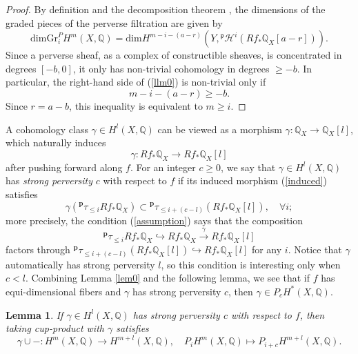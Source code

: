 \documentclass[11pt]{amsart}
\theoremstyle{plain}
\newtheorem{lem}[thm]{Lemma}
\theoremstyle{definition}
\theoremstyle{remark}
\newcommand{\BQ}{{\mathbb{Q}}}
\newcommand{\CH}{{\mathcal H}}
\begin{document}
\begin{proof}
By definition and the decomposition theorem \cite{BBD}, the dimensions of the graded pieces of the perverse filtration are given by
\begin{equation}\label{llm0}
\mathrm{dim} \mathrm{Gr}^P_iH^{m}(X, \BQ) = \mathrm{dim} H^{m-i-(a-r)}\left(Y,{^\mathfrak{p}\CH^i(Rf_* \BQ_X[a-r])}\right).
\end{equation}
Since a perverse sheaf, as a complex of constructible sheaves, is concentrated in degrees $[-b, 0]$, it only has non-trivial cohomology in degrees $\geq -b$. In particular, the right-hand side of (\ref{llm0}) is non-trivial only if 
\[
m-i-(a-r) \geq -b.
\]
Since $r=a-b$, this inequality is equivalent to $m \geq i$.
\end{proof}


A cohomology class $\gamma \in H^l(X, \BQ)$ can be viewed as a morphism $\gamma: \BQ_X \to \BQ_X[l]$, which naturally induces 
\begin{equation}\label{induced}
\gamma: Rf_* \BQ_X \to Rf_* \BQ_X [l]
\end{equation}
after pushing forward along $f$. For an integer $c\geq 0$, we say that $\gamma \in H^l(X, \BQ)$ has \emph{strong perversity} $c$ with respect to $f$ if its induced morphism (\ref{induced}) satisfies
\begin{equation}\label{assumption}
\gamma \left({^\mathbf{p}\tau_{\leq i} Rf_* \BQ_X}\right) \subset {^\mathbf{p}\tau_{\leq i+(c-l)}} \left(Rf_* \BQ_X  [l] \right), \quad \forall i;
\end{equation}
more precisely, the condition (\ref{assumption}) says that the composition
\[
{^\mathbf{p}\tau_{\leq i} Rf_* \BQ_X} \hookrightarrow Rf_* \BQ_X \xrightarrow{\gamma} Rf_* \BQ_X [l]
\]
factors through ${^\mathbf{p}\tau_{\leq i+(c-l)}} \left(Rf_* \BQ_X  [l] \right) \hookrightarrow Rf_* \BQ_X  [l]$ for any $i$.  Notice that $\gamma$ automatically has strong perversity $l$, so this condition is interesting only when $c < l$. Combining Lemma \ref{lem0} and the following lemma, we see that if $f$ has equi-dimensional fibers and $\gamma$ has strong perversity $c$, then $\gamma \in P_cH^*(X, \BQ)$.

\begin{lem}\label{lem1.1}
If $\gamma\in H^l(X, \BQ)$ has strong perversity $c$ with respect to $f$, then taking cup-product with $\gamma$ satisfies
\[
\gamma\cup - : H^m(X, \BQ) \to H^{m+l}(X, \BQ), \quad P_iH^m(X, \BQ) \mapsto P_{i+c}H^{m+l}(X, \BQ).
\]
\end{lem}
\end{document}
